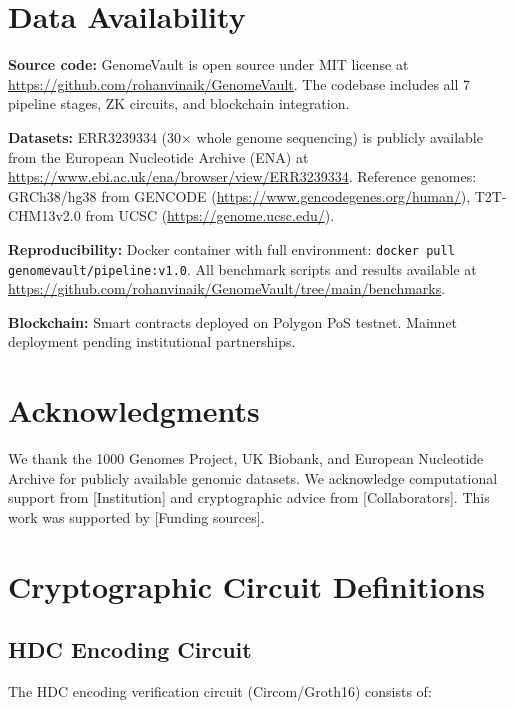 \documentclass[12pt,a4paper]{article}
\begin{document}
\section*{Data Availability}

\textbf{Source code:} GenomeVault is open source under MIT license at \url{https://github.com/rohanvinaik/GenomeVault}. The codebase includes all 7 pipeline stages, ZK circuits, and blockchain integration.

\textbf{Datasets:} ERR3239334 (30$\times$ whole genome sequencing) is publicly available from the European Nucleotide Archive (ENA) at \url{https://www.ebi.ac.uk/ena/browser/view/ERR3239334}. Reference genomes: GRCh38/hg38 from GENCODE (\url{https://www.gencodegenes.org/human/}), T2T-CHM13v2.0 from UCSC (\url{https://genome.ucsc.edu/}).

\textbf{Reproducibility:} Docker container with full environment: \texttt{docker pull genomevault/pipeline:v1.0}. All benchmark scripts and results available at \url{https://github.com/rohanvinaik/GenomeVault/tree/main/benchmarks}.

\textbf{Blockchain:} Smart contracts deployed on Polygon PoS testnet. Mainnet deployment pending institutional partnerships.

\section*{Acknowledgments}

We thank the 1000 Genomes Project, UK Biobank, and European Nucleotide Archive for publicly available genomic datasets. We acknowledge computational support from [Institution] and cryptographic advice from [Collaborators]. This work was supported by [Funding sources].




\appendix

\section{Cryptographic Circuit Definitions}

\subsection{HDC Encoding Circuit}

The HDC encoding verification circuit (Circom/Groth16) consists of:
\end{document}
